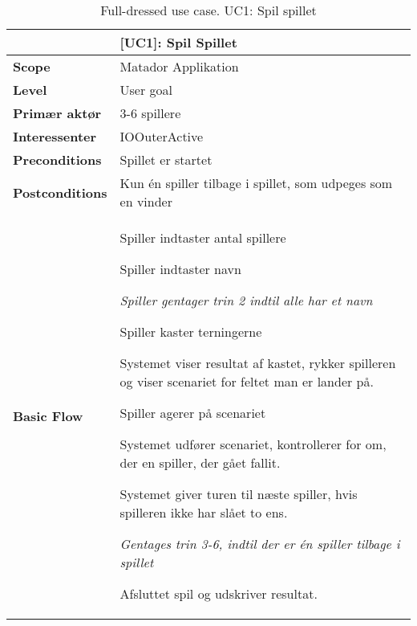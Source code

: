 \documentclass[class=article, crop=false]{standalone}
\makeatletter
\let\savespace\@minipagetrue
\makeatother
\begin{document}
    \begin{table}[H]
        \caption{Full-dressed use case. UC1: Spil spillet}
        \begin{tabularx}{\textwidth}{|l|X|}
            \hline
                                         & \textbf{[UC1]: Spil Spillet}   \\ \hline
            \textbf{Scope}               & Matador Applikation\\ \hline
            \textbf{Level}               & User goal     \\ \hline
            \textbf{Primær aktør}        & 3-6 spillere  \\ \hline
            \textbf{Interessenter}       & IOOuterActive\\ \hline
            \textbf{Preconditions}       & Spillet er startet \\ \hline
            \textbf{Postconditions}      & Kun én spiller tilbage i spillet,
                                           som udpeges som en vinder\\ \hline





            \textbf{Basic Flow} & \begin{tabenum}
                          \item Spiller indtaster antal spillere
                          \item Spiller indtaster navn
                              \savespace
                                \begin{compactitem}
                                    \item \textit{Spiller gentager trin 2                                                             indtil alle har et navn}
                          \end{compactitem}
                              \item Spiller kaster terningerne
                              \item Systemet viser resultat af kastet, rykker spilleren og viser scenariet for feltet man er lander på.
                              \item Spiller agerer på scenariet
                              \item Systemet udfører scenariet, kontrollerer for om, der en spiller, der gået fallit.
                          \item Systemet giver turen til næste spiller, hvis spilleren ikke har slået to ens.
                          \savespace
                          \begin{compactitem}
                              \item \textit{Gentages trin 3-6, indtil der er én spiller tilbage i spillet}
                          \end{compactitem}
                              \item Afsluttet spil og udskriver resultat.
                           \end{tabenum}   \\ \hline





\end{tabularx}
\end{table}
\end{document}
